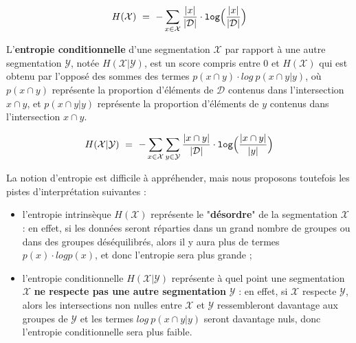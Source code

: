 		\begin{equation}
			\label{equation:D.1-ANNEXE-EVALUATION-CLUSTERING-DEFINITION-ENTROPTY}
			H(\mathcal{X})~=~
				-
				\sum\limits_{
					x \in \mathcal{X}
				}
				\frac{
					|x|
				}{
					|\mathcal{D}|
				}
				\cdot
				\texttt{log} \Bigl(
					\frac{
						|x|
					}{
						|\mathcal{D}|
					}
				\Bigr)
		\end{equation}
		
		L'\textbf{entropie conditionnelle} d'une segmentation $\mathcal{X}$ par rapport à une autre segmentation $\mathcal{Y}$, notée $H(\mathcal{X}|\mathcal{Y})$, est un score compris entre $0$ et $H(\mathcal{X})$ qui est obtenu par l'opposé des sommes des termes $p(x \cap y) \cdot log~p(x \cap y|y)$,
		où $p(x \cap y)$ représente la proportion d'éléments de $\mathcal{D}$ contenus dans l'intersection $x \cap y$,
		et $p(x \cap y|y)$ représente la proportion d'éléments de $y$ contenus dans l'intersection $x \cap y$.
		
		\begin{equation}
			\label{equation:D.1-ANNEXE-EVALUATION-CLUSTERING-DEFINITION-ENTROPTY-CONDITIONNELLE}
			H(\mathcal{X}|\mathcal{Y})~=~
				-
				\sum\limits_{
					x \in \mathcal{X}
				}
				\sum\limits_{
					y \in \mathcal{Y}
				}
				\frac{
					|x \cap y|
				}{
					|\mathcal{D}|
				}
				\cdot
				\texttt{log} \Bigl(
					\frac{
						|x \cap y|
					}{
						|y|
					}
				\Bigr)
		\end{equation}
		
		\begin{leftBarAuthorOpinion}
			La notion d'entropie est difficile à appréhender, mais nous proposons toutefois les pistes d'interprétation suivantes :
			\begin{itemize}
				\item l'entropie intrinsèque $H(\mathcal{X})$ représente le "\textbf{désordre}" de la segmentation $\mathcal{X}$ :
				en effet, si les données seront réparties dans un grand nombre de groupes ou dans des groupes déséquilibrés, alors il y aura plus de termes $p(x) \cdot log p(x)$, et donc l'entropie sera plus grande ;
				\item l'entropie conditionnelle $H(\mathcal{X}|\mathcal{Y})$ représente à quel point une segmentation $\mathcal{X}$ \textbf{ne respecte pas une autre segmentation} $\mathcal{Y}$ :
				en effet, si $\mathcal{X}$ respecte $\mathcal{Y}$, alors les intersections non nulles entre $\mathcal{X}$ et $\mathcal{Y}$ ressembleront davantage aux groupes de $\mathcal{Y}$ et les termes $log~p(x \cap y|y)$ seront davantage nuls, donc l'entropie conditionnelle sera plus faible.
			\end{itemize}
		\end{leftBarAuthorOpinion}
		

